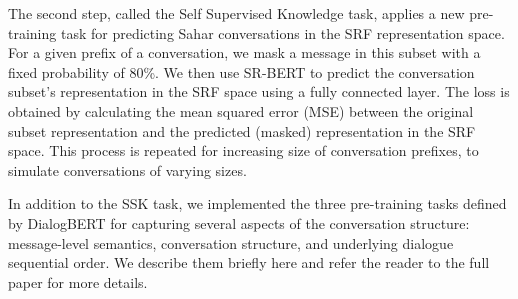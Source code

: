 \documentclass[letterpaper]{article} %
\begin{document}
The second step, called   the Self Supervised Knowledge task, applies a new pre-training task  for predicting  Sahar conversations in the SRF representation space.  
For  a given  prefix of a conversation, we  mask a message in this subset  with a fixed probability of 80\%. 
We then use SR-BERT to predict the conversation subset's representation in the SRF space using a fully connected layer.
The loss is obtained by calculating the mean squared error (MSE) 
between the original subset representation and the predicted (masked) representation in the SRF space.
This process is repeated for increasing size of conversation prefixes, to simulate conversations of varying sizes.



In addition to the SSK task, we implemented  the  three pre-training tasks defined by DialogBERT\cite{gu2021dialogbert} for capturing several aspects of the conversation structure: message-level semantics, conversation structure, and underlying dialogue sequential order. We describe them briefly here and refer the reader to the full paper for more details.
\end{document}
